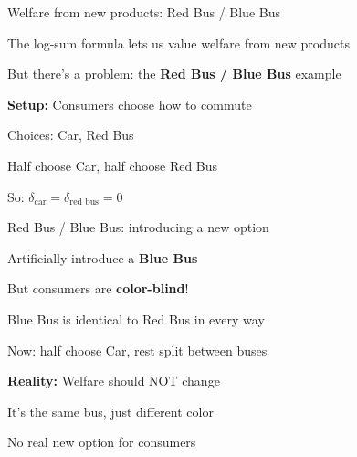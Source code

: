 \documentclass[notes,11pt, aspectratio=169]{beamer}
\newenvironment{wideitemize}{\itemize\addtolength{\itemsep}{10pt}}{\enditemize}
\begin{document}
\begin{frame}{Welfare from new products: Red Bus / Blue Bus}
	\begin{wideitemize}
		\item The log-sum formula lets us value welfare from new products
		\item But there's a problem: the \textbf{Red Bus / Blue Bus} example
		\item \textbf{Setup:} Consumers choose how to commute
		\begin{wideitemize}
			\vspace{5pt}
			\item Choices: Car, Red Bus
			\item Half choose Car, half choose Red Bus
			\item So: $\delta_{\text{car}} = \delta_{\text{red bus}} = 0$
		\end{wideitemize}
	\end{wideitemize}
\end{frame}

\begin{frame}{Red Bus / Blue Bus: introducing a new option}
	\begin{wideitemize}
		\item Artificially introduce a \textbf{Blue Bus}
		\item But consumers are \textbf{color-blind}!
		\item Blue Bus is identical to Red Bus in every way
		\item Now: half choose Car, rest split between buses
		\item \textbf{Reality:} Welfare should NOT change
		\begin{wideitemize}
			\vspace{5pt}
			\item It's the same bus, just different color
			\item No real new option for consumers
		\end{wideitemize}
	\end{wideitemize}
\end{frame}
\end{document}
